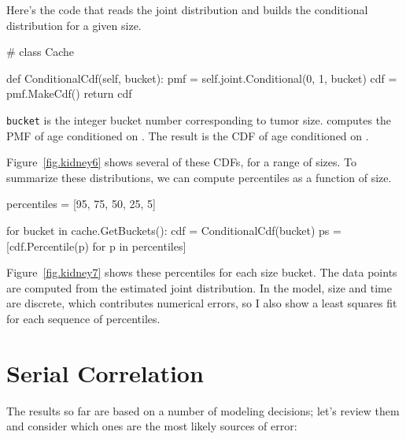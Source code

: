\documentclass[12pt]{book}
\theoremstyle{exercise}
\begin{document}
Here's the code that reads the joint distribution and builds
the conditional distribution for a given size.

\begin{code}
# class Cache

    def ConditionalCdf(self, bucket):
        pmf = self.joint.Conditional(0, 1, bucket)
        cdf = pmf.MakeCdf()
        return cdf
\end{code}

\verb"bucket" is the integer bucket number corresponding to
tumor size.   computes the
PMF of age conditioned on .
The result is the CDF of age conditioned on .

Figure~\ref{fig.kidney6} shows several of these CDFs, for
a range of sizes.  To summarize these distributions, we can
compute percentiles as a function of size.

\begin{code}
    percentiles = [95, 75, 50, 25, 5]

    for bucket in cache.GetBuckets():
        cdf = ConditionalCdf(bucket)      
        ps = [cdf.Percentile(p) for p in percentiles]
\end{code}

Figure~\ref{fig.kidney7} shows these percentiles for each
size bucket.  The data points are computed from the estimated
joint distribution.  In the model, size and time are discrete,
which contributes numerical errors, so I also show a least 
squares fit for each sequence of percentiles.


\section{Serial Correlation}
\label{serial}

The results so far are based on a number of modeling decisions;
let's review them and consider which ones are the most
likely sources of error:
\end{document}
